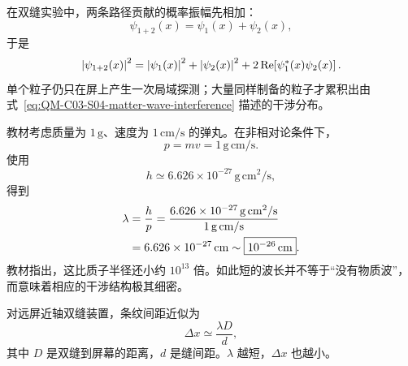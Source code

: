 在双缝实验中，两条路径贡献的概率振幅先相加：
\begin{equation}
  \psi_{1+2}(x)=\psi_1(x)+\psi_2(x),
  \label{eq:QM-C03-S04-matter-wave-superposition}
\end{equation}
于是
\begin{equation}
  \left|\psi_{1+2}(x)\right|^2
  =\left|\psi_1(x)\right|^2+\left|\psi_2(x)\right|^2
   +2\operatorname{Re}\!\left[\psi_1^*(x)\psi_2(x)\right].
  \label{eq:QM-C03-S04-matter-wave-interference}
\end{equation}
单个粒子仍只在屏上产生一次局域探测；大量同样制备的粒子才累积出由式~\eqref{eq:QM-C03-S04-matter-wave-interference} 描述的干涉分布。



教材考虑质量为 $1\,\mathrm{g}$、速度为 $1\,\mathrm{cm/s}$ 的弹丸。在非相对论条件下，
\begin{equation}
  p=mv
  =1\,\mathrm{g\,cm/s}.
  \label{eq:QM-C03-S04-pellet-momentum}
\end{equation}
使用
\[
  h\simeq
  6.626\times10^{-27}\,
  \mathrm{g\,cm^2/s},
\]
得到
\begin{align}
  \lambda
  &=\frac{h}{p}
    =\frac{6.626\times10^{-27}\,
      \mathrm{g\,cm^2/s}}
      {1\,\mathrm{g\,cm/s}}
  \notag\\
  &=6.626\times10^{-27}\,\mathrm{cm}
    \sim\boxed{10^{-26}\,\mathrm{cm}}.
  \label{eq:QM-C03-S04-pellet-wavelength}
\end{align}
教材指出，这比质子半径还小约 $10^{13}$ 倍。如此短的波长并不等于“没有物质波”，而意味着相应的干涉结构极其细密。

对远屏近轴双缝装置，条纹间距近似为
\begin{equation}
  \boxed{\Delta x\simeq\frac{\lambda D}{d}},
  \label{eq:QM-C03-S04-fringe-spacing}
\end{equation}
其中 $D$ 是双缝到屏幕的距离，$d$ 是缝间距。$\lambda$ 越短，$\Delta x$ 也越小。

